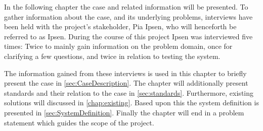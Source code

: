 In the following chapter the case and related information will be presented.
To gather information about the case, and its underlying problems, interviews have been held with the project's stakeholder, Pia Ipsen, who will henceforth be referred to as Ipsen.
During the course of this project Ipsen was interviewed five times:
Twice to mainly gain information on the problem domain,
once for clarifying a few questions,
and twice in relation to testing the system.

The information gained from these interviews is used in this chapter to briefly present the case in \cref{sec:CaseDescription}.
The chapter will additionally present standards and their relation to the case in \cref{sec:standards}.
Furthermore, existing solutions will discussed in \cref{chap:existing}.
Based upon this the system definition is presented in \cref{sec:SystemDefinition}.
Finally the chapter will end in a problem statement which guides the scope of the project.

